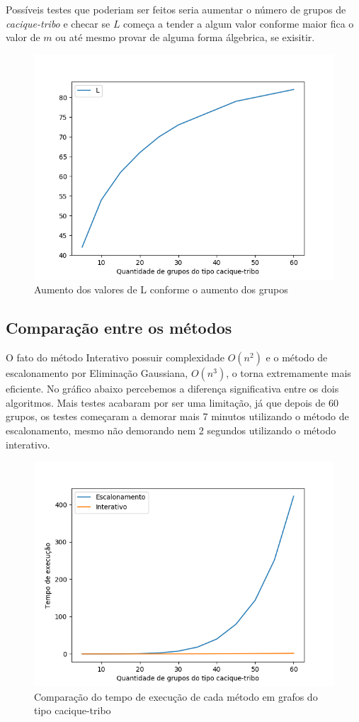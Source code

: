 \documentclass[12pt]{article}
\begin{document}
			Possíveis testes que poderiam ser feitos seria aumentar o número de grupos de \emph{cacique-tribo} e checar se $L$ começa a tender a algum valor conforme maior fica o valor de $m$ ou até mesmo provar de alguma forma álgebrica, se exisitir.
			\begin{figure}[h]
  				\centering
  				\includegraphics[width=0.7\linewidth]{figure_L.png}
  				\caption{Aumento dos valores de L conforme o aumento dos grupos} \label{fig:M1}
			\end{figure}


	\subsection{Comparação entre os métodos}
		
		O fato do método Interativo possuir complexidade $O(n^2)$ e o método de escalonamento por Eliminação Gaussiana, $O(n^3)$, o torna extremamente mais eficiente. No gráfico abaixo percebemos a diferença significativa entre os dois algoritmos. Mais testes acabaram por ser uma limitação, já que depois de 60 grupos, os testes começaram a demorar mais 7 minutos utilizando o método de escalonamento, mesmo não demorando nem 2 segundos utilizando o método interativo.
		
		\begin{figure}
  			\centering
  			\includegraphics[width=0.7\linewidth]{comparacao_e_i.png}
  			\caption{Comparação do tempo de execução de cada método em grafos do tipo cacique-tribo}  \label{fig:M1}
		\end{figure}
		
\end{document}
